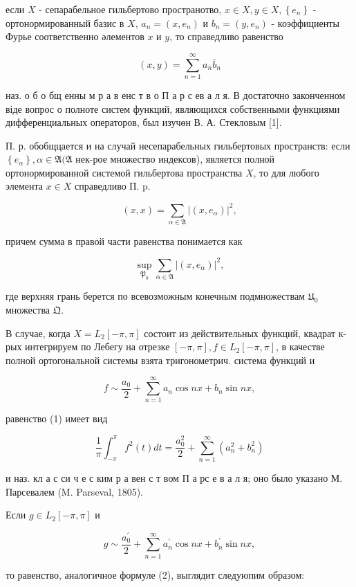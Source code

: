 \documentclass[10pt]{article}
\begin{document}
если $X$ - сепарабельное гильбертово пространотво, $x \in X, y \in X,\left\{e_{n}\right\}$ - ортонормированный базис в $X$, $a_{n}=\left(x, e_{n}\right)$ и $b_{n}=\left(y, e_{n}\right)$ - коэффициенты Фурье соответственно әлементов $x$ и $y$, то справедливо равенство

\[
(x, y)=\sum_{n=1}^{\infty} a_{n} \bar{b}_{n}
\]

наз. о б о бщ енны м р а в енс т в о П а р с ев а л я. В достаточно законченном віде вопрос о полноте систем функций, являющихся собственными функциями дифференциальных операторов, был изучөн В. А. Стекловым [1].

П. р. обобщцается и на случай несепарабельных гильбертовых пространств: если $\left\{e_{\alpha}\right\}, \alpha \in \mathfrak{A}(\mathfrak{A}$ нек-рое множество индексов), является полной ортонормированной системой гильбертова пространства $X$, то для любого элемента $x \in X$ справедливо П. $\mathrm{p}$.

\[
(x, x)=\sum_{\alpha \in \mathfrak{A}}\left|\left(x, e_{\alpha}\right)\right|^{2},
\]

причем сумма в правой части равенства понимается как

\[
\sup _{\mathfrak{P}_{0}} \sum_{\alpha \in \mathfrak{A}}\left|\left(x, e_{\alpha}\right)\right|^{2},
\]

где верхняя грань берется по всевозможным конечным подмножествам $\mathfrak{U}_{0}$ множества $\mathfrak{Q}$.

В случае, когда $X=L_{2}[-\pi, \pi]$ состоит из действительных функций, квадрат к-рых интегрируем по Лебегу на отрезке $[-\pi, \pi], f \in L_{2}[-\pi, \pi]$, в качестве полной ортогональной системы взята тригонометрич. система функций и

\[
f \sim \frac{a_{0}}{2}+\sum_{n=1}^{\infty} a_{n} \cos n x+b_{n} \sin n x,
\]

равенство (1) имеет вид

\[
\frac{1}{\pi} \int_{-\pi}^{\pi} f^{2}(t) d t=\frac{a_{0}^{2}}{2}+\sum_{n=1}^{\infty}\left(a_{n}^{2}+b_{n}^{2}\right)
\]

и наз. кл а с си ч е с ким р а вен с т вом П а рс е в а л я; оно было указано М. Парсевалем (M. Parseval, 1805).

Если $g \in L_{2}[-\pi, \pi]$ и

\[
g \sim \frac{a_{0}^{\prime}}{2}+\sum_{n=1}^{\infty} a_{n}^{\prime} \cos n x+b_{n}^{\prime} \sin n x,
\]

то равенство, аналогичное формуле (2), выглядит следуюпим образом:
\end{document}
